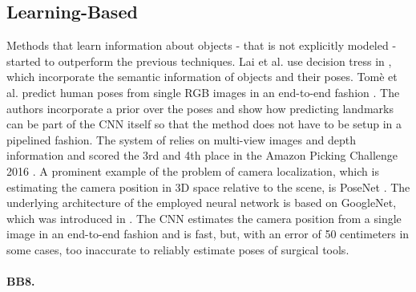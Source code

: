 \subsection{Learning-Based}

Methods that learn information about objects - that is not explicitly modeled - started to outperform the previous techniques.
\nnewline
Lai et al. use decision tress in \cite{klai}, which incorporate the semantic information of objects and their poses. Tom{\`{e}} et al. predict human poses from single RGB images in an end-to-end fashion \cite{dtome}. The authors incorporate a prior over the poses and show how predicting landmarks can be part of the CNN itself so that the method does not have to be setup in a pipelined fashion. The system of \cite{azeng} relies on multi-view images and depth information and scored the 3rd and 4th place in the Amazon Picking Challenge 2016 \cite{apc}. A prominent example of the problem of camera localization, which is estimating the camera position in 3D space relative to the scene, is PoseNet \cite{posenet}. The underlying architecture of the employed neural network is based on GoogleNet, which was introduced in \cite{googlenet}. The CNN estimates the camera position from a single image in an end-to-end fashion and is fast, but, with an error of 50 centimeters in some cases, too inaccurate to reliably estimate poses of surgical tools.

\paragraph{BB8.}

